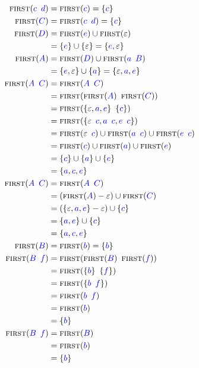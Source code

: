 \documentclass{article}
\newcommand{\FIRST}{\textsc{first}}
\newcommand{\Symbol}[1]{\textcolor{blue}{#1}}
\newcommand{\Null}{\varepsilon}
\newcommand{\Seq}{{\ \,}}
\begin{document}
\begin{align*}
  \FIRST(\Symbol{c} \Seq \Symbol{d}) &= \FIRST(\Symbol{c}) = \{\Symbol{c}\} \\
  \FIRST(\Symbol{C}) &= \FIRST(\Symbol{c} \Seq \Symbol{d}) = \{\Symbol{c}\} \\
  \FIRST(\Symbol{D}) &= \FIRST(\Symbol{e}) \cup \FIRST(\Null) \\
            &= \{\Symbol{e}\} \cup \{\Null\} = \{\Symbol{e}, \Null\} \\
  \FIRST(\Symbol{A}) &= \FIRST(\Symbol{D}) \cup \FIRST(\Symbol{a} \Seq \Symbol{B}) \\
            &= \{\Symbol{e}, \Null\} \cup \{\Symbol{a}\} = \{\Null, \Symbol{a}, \Symbol{e}\} \\
  \FIRST(\Symbol{A} \Seq \Symbol{C}) &= \FIRST(\Symbol{A} \Seq \Symbol{C}) \\
            &= \FIRST(\FIRST(\Symbol{A}) \Seq \FIRST(\Symbol{C})) \\
            &= \FIRST(\{\Null, \Symbol{a}, \Symbol{e}\} \Seq \{\Symbol{c}\})\\
            &= \FIRST(\{\Null \Seq \Symbol{c}, \Symbol{a} \Seq \Symbol{c}, \Symbol{e} \Seq \Symbol{c}\})\\
            &= \FIRST(\Null \Seq \Symbol{c}) \cup \FIRST(\Symbol{a} \Seq \Symbol{c}) \cup \FIRST(\Symbol{e} \Seq \Symbol{c}) \\
            &= \FIRST(\Symbol{c}) \cup \FIRST(\Symbol{a}) \cup \FIRST(\Symbol{e}) \\
            &= \{\Symbol{c}\} \cup \{\Symbol{a}\} \cup \{\Symbol{e}\} \\
            &= \{\Symbol{a}, \Symbol{c}, \Symbol{e}\}\\
  \FIRST(\Symbol{A} \Seq \Symbol{C}) &= \FIRST(\Symbol{A} \Seq \Symbol{C}) \\
            &= (\FIRST(\Symbol{A}) - \Null) \cup \FIRST(\Symbol{C}) \\
            &= (\{\Null, \Symbol{a}, \Symbol{e}\} - \Null) \cup \{\Symbol{c}\} \\
            &= \{\Symbol{a}, \Symbol{e}\} \cup \{\Symbol{c}\}\\
            &= \{\Symbol{a}, \Symbol{c}, \Symbol{e}\}\\
  \FIRST(\Symbol{B}) &= \FIRST(\Symbol{b}) = \{\Symbol{b}\} \\
  \FIRST(\Symbol{B} \Seq \Symbol{f}) &= \FIRST(\FIRST(\Symbol{B}) \Seq \FIRST(\Symbol{f})) \\
            &= \FIRST(\{\Symbol{b}\} \Seq \{\Symbol{f}\})\\
            &= \FIRST(\{\Symbol{b} \Seq \Symbol{f}\})\\
            &= \FIRST(\Symbol{b} \Seq \Symbol{f})\\
            &= \FIRST(\Symbol{b})\\
            &= \{\Symbol{b}\}\\
  \FIRST(\Symbol{B} \Seq \Symbol{f}) &= \FIRST(\Symbol{B})\\
            &= \FIRST(\Symbol{b})\\
            &= \{\Symbol{b}\}
\end{align*}
\end{document}
